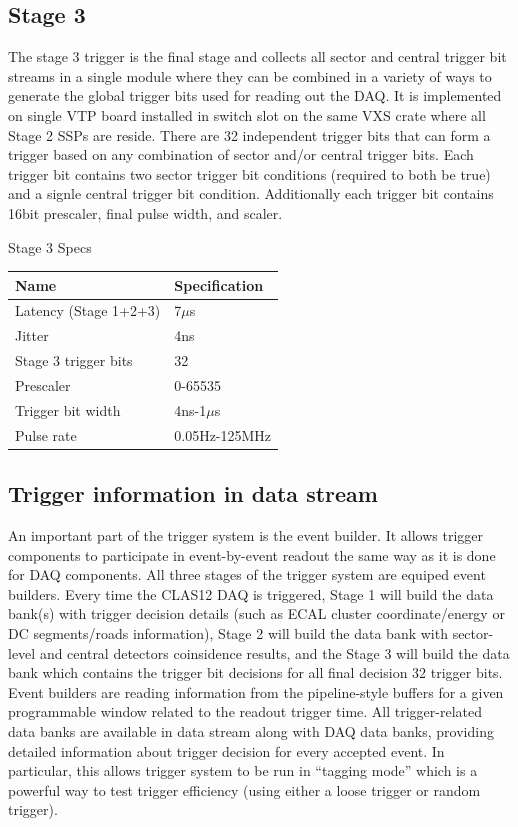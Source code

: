 \subsection{Stage 3}

The stage 3 trigger is the final stage and collects all sector and central trigger bit streams in a single module where they can be combined in a variety of ways to generate the global trigger bits used for reading out the DAQ. It is implemented on single VTP board installed in switch slot on the same VXS crate where all Stage 2 SSPs are reside. There are 32 independent trigger bits that can form a trigger based on any combination of sector and/or central trigger bits. Each trigger bit contains two sector trigger bit conditions (required to both be true) and a signle central trigger bit condition. Additionally each trigger bit contains 16bit prescaler, final pulse width, and scaler.

\begin{center}
	Stage 3 Specs\\
	\begin{tabular}{| l | l |}
		\hline \hline
		Name				& Specification	\\
		\hline
		Latency (Stage 1+2+3)		& 7$\mu$s	\\
		Jitter				& 4ns		\\
		Stage 3 trigger bits		& 32		\\
		Prescaler			& 0-65535	\\
		Trigger bit width		& 4ns-1$\mu$s	\\
		Pulse rate			& 0.05Hz-125MHz	\\
		\hline \hline
	\end{tabular}
\end{center}


\subsection{Trigger information in data stream}
\label{sec:trigger_in_datastream}

An important part of the trigger system is the event builder. It allows trigger components to participate in event-by-event readout the same way as it is done for DAQ components. All three stages of the trigger system are equiped  event builders. Every time the CLAS12 DAQ is triggered, Stage 1 will build the data bank(s) with trigger decision details (such as ECAL cluster coordinate/energy or DC segments/roads information), Stage 2 will build the data bank with sector-level and central detectors coinsidence results, and the Stage 3 will build the data bank which contains the trigger bit decisions for all final decision 32 trigger bits. Event builders are reading information from the pipeline-style buffers for a given programmable window related to the readout trigger time. All trigger-related data banks are available in data stream along with DAQ data banks, providing detailed information about trigger decision for every accepted event. In particular, this allows trigger system to be run in ``tagging mode'' which is a powerful way to test trigger efficiency (using either a loose trigger or random trigger).
